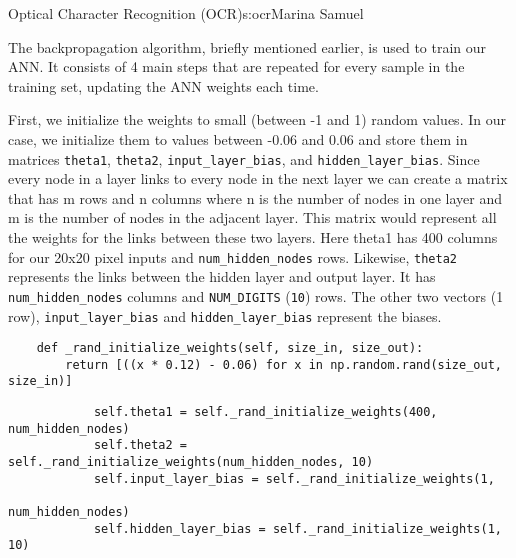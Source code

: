 \begin{aosachapter}{Optical Character Recognition (OCR)}{s:ocr}{Marina Samuel}
\label{training-via-backpropagation-ocr.py}

The backpropagation algorithm, briefly mentioned earlier, is used to
train our ANN. It consists of 4 main steps that are repeated for every
sample in the training set, updating the ANN weights each time.

First, we initialize the weights to small (between -1 and 1) random
values. In our case, we initialize them to values between -0.06 and 0.06
and store them in matrices \texttt{theta1}, \texttt{theta2},
\texttt{input\_layer\_bias}, and \texttt{hidden\_layer\_bias}. Since
every node in a layer links to every node in the next layer we can
create a matrix that has m rows and n columns where n is the number of
nodes in one layer and m is the number of nodes in the adjacent layer.
This matrix would represent all the weights for the links between these
two layers. Here theta1 has 400 columns for our 20x20 pixel inputs and
\texttt{num\_hidden\_nodes} rows. Likewise, \texttt{theta2} represents
the links between the hidden layer and output layer. It has
\texttt{num\_hidden\_nodes} columns and \texttt{NUM\_DIGITS}
(\texttt{10}) rows. The other two vectors (1 row),
\texttt{input\_layer\_bias} and \texttt{hidden\_layer\_bias} represent
the biases.

\begin{verbatim}
    def _rand_initialize_weights(self, size_in, size_out):
        return [((x * 0.12) - 0.06) for x in np.random.rand(size_out, size_in)]
\end{verbatim}

\begin{verbatim}
            self.theta1 = self._rand_initialize_weights(400, num_hidden_nodes)
            self.theta2 = self._rand_initialize_weights(num_hidden_nodes, 10)
            self.input_layer_bias = self._rand_initialize_weights(1, 
                                                                  num_hidden_nodes)
            self.hidden_layer_bias = self._rand_initialize_weights(1, 10)
\end{verbatim}


\end{aosachapter}
